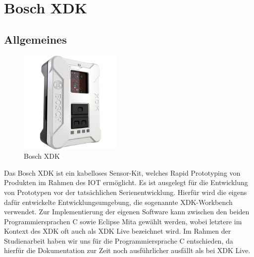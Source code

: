 \section{Bosch \acf{XDK}}\label{sec:Bosch XDK}
\subsection{Allgemeines}\label{subsec:Allgemeines}
\begin{figure}[H]
	\centering
	\includegraphics[width=5cm]{images/xdk.jpg}	
	\caption{Bosch \acs*{XDK}}
	\label{fig:XDK}
\end{figure}
Das Bosch \acf{XDK} ist ein kabelloses Sensor-Kit, welches Rapid Prototyping von Produkten im Rahmen des \acf{IOT} ermöglicht. Es ist ausgelegt für die Entwicklung von Prototypen vor der tatsächlichen Serienentwicklung. 
Hierfür wird die eigens dafür entwickelte Entwicklungsumgebung, die sogenannte XDK-Workbench verwendet. Zur Implementierung der eigenen Software kann zwischen den beiden Programmiersprachen C sowie Eclipse Mita gewählt werden, wobei letztere im Kontext des XDK oft auch als XDK Live bezeichnet wird. Im Rahmen der Studienarbeit haben wir uns für die Programmiersprache C entschieden, da hierfür die Dokumentation zur Zeit noch ausführlicher ausfällt als bei XDK Live.
